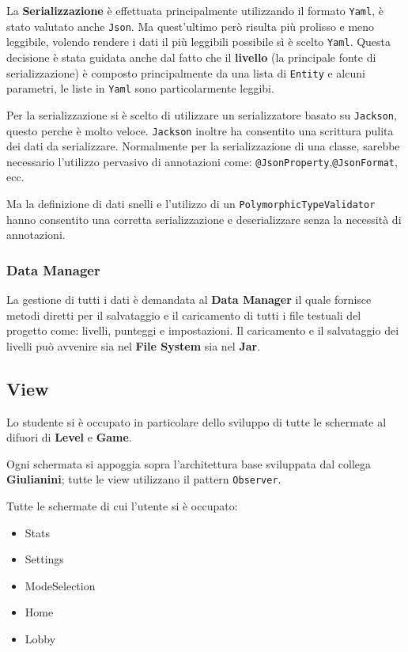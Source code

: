     La \textbf{Serializzazione} è effettuata principalmente utilizzando il formato 
    \texttt{Yaml}, è stato valutato anche \texttt{Json}.
    Ma quest'ultimo però risulta più prolisso e meno leggibile, volendo rendere i dati il più leggibili possibile sì è scelto \texttt{Yaml}.
    Questa decisione è stata guidata anche dal fatto che il \textbf{livello} (la principale fonte di serializzazione) è composto principalmente da una lista di \texttt{Entity} e alcuni parametri, le liste in  \texttt{Yaml} sono particolarmente leggibi.
    
    Per la serializzazione si è scelto di utilizzare un serializzatore basato su \texttt{Jackson}, questo perche
    è molto veloce.
    \texttt{Jackson} inoltre ha consentito una scrittura pulita dei dati da serializzare.
    Normalmente per la serializzazione di una classe, sarebbe necessario l'utilizzo pervasivo di annotazioni come: \texttt{@JsonProperty},\texttt{@JsonFormat}, ecc.
    
    Ma la definizione di dati snelli e l'utilizzo di un \texttt{PolymorphicTypeValidator} hanno consentito una corretta serializzazione e deserializzare senza la necessità di annotazioni.
    
    \subsubsection{Data Manager}
    La gestione di tutti i dati è demandata al \textbf{Data Manager}
    il quale fornisce metodi diretti per il salvataggio e il caricamento di tutti i file testuali del progetto come: livelli, punteggi e impostazioni.
    Il caricamento e il salvataggio dei livelli può avvenire sia nel \textbf{File System} sia nel \textbf{Jar}.
    
    
    \subsection{View}
    Lo studente si è occupato in particolare dello sviluppo di tutte le schermate al difuori di \textbf{Level} e \textbf{Game}.
    
    Ogni schermata si appoggia sopra l'architettura base sviluppata dal collega \textbf{Giulianini}; tutte le view utilizzano il pattern \texttt{Observer}.
    
    Tutte le schermate di cui l'utente si è occupato:
        \begin{itemize}
	        \item Stats
	        \item Settings
	        \item ModeSelection
            \item Home
            \item Lobby
        \end{itemize}


